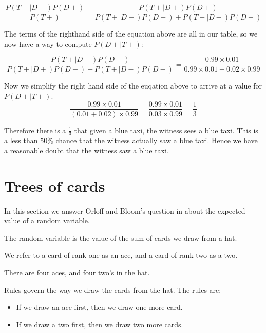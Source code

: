\documentclass[a4paper,11pt]{article}
\begin{document}
\begin{equation}
\frac{ P \left( T+ \mid D+ \right) P \left( D+ \right) }
    { P \left( T+ \right) }
  = 
\frac{ P \left( T+ \mid D+ \right) P \left( D+ \right) }
    { P \left( T+ \mid D+ \right) P \left( D+ \right) 
      + P \left( T+ \mid D- \right) P \left(D- \right)}
\end{equation}

The terms of the righthand side of the equation above are all in our
table, so we now have a way to compute $P \left( D+ \mid T+ \right)$:

\begin{equation}
\frac{ P \left( T+ \mid D+ \right) P \left( D+ \right) }
    { P \left( T+ \mid D+ \right) P \left( D+ \right) 
      + P \left( T+ \mid D- \right) P \left(D- \right)}
  = \frac{ 0.99 \times 0.01 }
  { 0.99 \times 0.01 + 0.02 \times 0.99 }
\end{equation}

Now we simplify the right hand side of the euqation above to arrive at
a value for $P \left( D+ \mid T+ \right)$.
\begin{equation}
 \frac{ 0.99 \times 0.01 }
  {  \left(0.01 + 0.02 \right) \times 0.99 }
  = \frac{ 0.99 \times 0.01 }
  {  0.03 \times 0.99 }
  = \frac{1}{3}
\end{equation}

Therefore there is a $\frac{1}{3}$ that given a blue taxi, the witness
sees a blue taxi.  This is a less than $50\%$ chance that the witness
actually saw a blue taxi. Hence we have a reasonable doubt that the 
witness saw a blue taxi.

\section{Trees of cards}
\label{treesOfCards}
In this section we answer Orloff and Bloom's question in \cite{probSet2}
about the expected value of a random variable.

The random variable is the value of the sum of cards we draw from a 
hat.  

We refer to a card of rank one as an ace, and a card of rank two as
a two.

There are four aces, and four two's in the hat.

Rules govern the way we draw the cards from the hat.  The rules are: 
\begin{itemize}
\item If we draw an ace first, then we draw one more card. 
\item If we draw a two first, then we draw two more cards.
\end{itemize}
\end{document}
